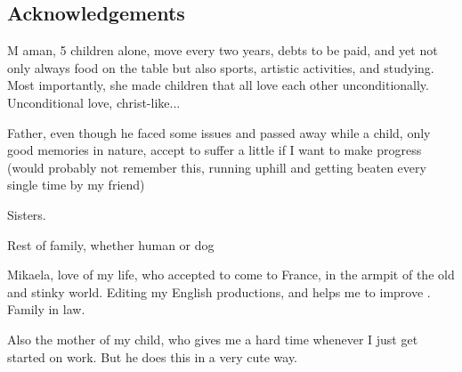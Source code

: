 
{}

\vspace*{-1.6cm}
\begin{flushright}
\section*{\fontsize{20pt}{20pt}\selectfont\textnormal{Acknowledgements}}
\end{flushright}
\vspace{-0.2cm}


\chead[\fancyplain{}{}]
      {\fancyplain{}{}}
\lfoot[\fancyplain{}{}]
      {\fancyplain{}{}}
\cfoot[\fancyplain{}{\thepage}]
      {\fancyplain{}{\thepage}}
\rfoot[\fancyplain{}{}]%
     {\fancyplain{}{\scriptsize}}


\lettrine[lines=1]{M}{ } aman, 5 children alone, move every two years, debts to be paid, and yet not only always food on the table but also sports, artistic activities, and studying. Most importantly, she made children that all love each other unconditionally. Unconditional love, christ-like... 

Father, even though he faced some issues and passed away while a child, only good memories in nature, accept to suffer a little if I want to make progress (would probably not remember this, running uphill and getting beaten every single time by my friend)

Sisters.

Rest of family, whether human or dog

Mikaela, love of my life, who accepted to come to France, in the armpit of the old and stinky world. 
Editing my English productions, and helps me to improve .
Family in law.

Also the mother of my child, who gives me a hard time whenever I just get started on work. But he does this in a very cute way.

